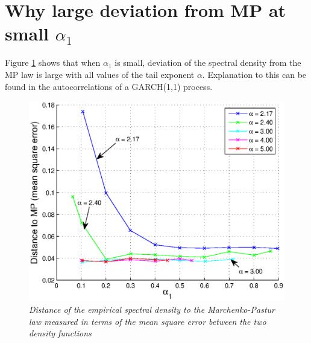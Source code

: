 \documentclass{article}
\begin{document}
\section{Why large deviation from MP at small $\alpha_1$}
Figure \ref{fig:Distance_to_MP} shows that when $\alpha_1$ is small,
deviation of the spectral density from the MP law is large with all
values of the tail exponent $\alpha$. Explanation to this can be found
in the autocorrelations of a GARCH(1,1) process.
\begin{figure}[htb!]
  \centering
    \includegraphics[scale=0.6]{../pics/Distance_to_MP.eps}
    \caption{\small \it Distance of the empirical spectral density to
      the Marchenko-Pastur law measured in terms of the mean square
      error between the two density functions}
    \label{fig:Distance_to_MP}
\end{figure}
\end{document}
